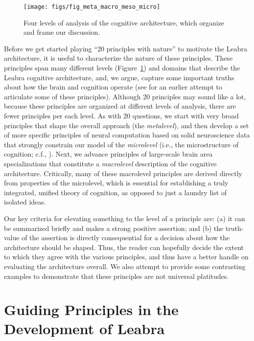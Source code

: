 \documentclass[11pt,twoside]{article}
\begin{document}
\begin{figure}
  \centering\texttt{[image: figs/fig\_meta\_macro\_meso\_micro]}
  \caption{\small Four levels of analysis of the cognitive architecture, which
    organize and frame our discussion.}
  \label{fig.levels}
\end{figure}

Before we get started playing ``20 principles with nature'' to motivate the
Leabra architecture, it is useful to characterize the nature of these
principles.  These principles span many different levels
(Figure~\ref{fig.levels}) and domains that describe the Leabra cognitive
architecture, and, we argue, capture some important truths about how the brain
and cognition operate (see  for an earlier attempt to
articulate some of these principles).  Although 20 principles may sound like a
lot, because these principles are organized at different levels of analysis,
there are fewer principles per each level.  As with 20 questions, we start
with very broad principles that shape the overall approach (the {\em
  metalevel}), and then develop a set of more specific principles of neural
computation based on solid neuroscience data that strongly constrain our model
of the {\em microlevel} (i.e., the microstructure of cognition; c.f.,
).
Next, we advance principles of large-scale brain area specializations that
constitute a {\em macrolevel} description of the cognitive architecture.
Critically, many of these macrolevel principles are derived directly from
properties of the microlevel, which is essential for establishing a truly
integrated, unified theory of cognition, as opposed to just a laundry list of
isolated ideas.

Our key criteria for elevating something to the level of a principle are: (a)
it can be summarized briefly and makes a strong positive assertion; and (b)
the truth-value of the assertion is directly consequential for a decision
about how the architecture should be shaped.  Thus, the reader can hopefully
decide the extent to which they agree with the various principles, and thus
have a better handle on evaluating the architecture overall.  We also attempt
to provide some contrasting examples to demonstrate that these principles are
not universal platitudes.

\section{Guiding Principles in the Development of Leabra}
\end{document}
